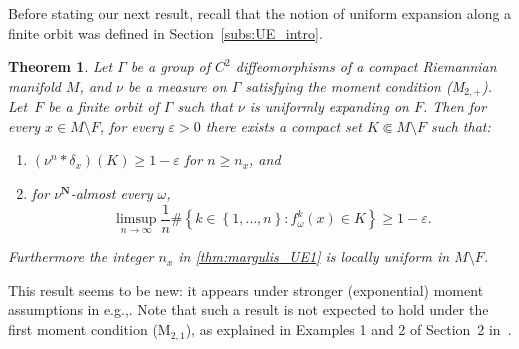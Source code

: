 \documentclass[11pt]{article}
\newcommand{\eg}{e.g.,\xspace}
\let\sep :
\let\e\varepsilon
\newcommand{\set}[1]{\left\{#1\right\}}
\newcommand{\unsur}[1]{\frac{1}{#1}}
\def\N{\mathbf{N}}
\theoremstyle{plain}
\newtheorem{thm}{Theorem}[section]
\theoremstyle{definition}
\numberwithin{equation}{section}
\begin{document}
Before stating our next result, recall that the notion of uniform expansion along a finite orbit was defined in Section~\ref{subs:UE_intro}.

\begin{thm}\label{thm:margulis_UE}
Let $\Gamma$ be a group of $C^2$ diffeomorphisms of a compact Riemannian
manifold $M$, and $\nu$ be a measure on
$\Gamma$ satisfying the moment condition (M$_{2,+}$).
Let~$F$ be a finite orbit of $\Gamma$ such that $\nu$ is uniformly expanding on $F$.
Then for every $x\in M\setminus F$, for every $\e>0$
there exists a compact set $K\Subset M\setminus F$ such that:
\begin{enumerate}
\item\label{thm:margulis_UE1} $(\nu^{n}\ast \delta_x) (K) \geq 1- \e$ for $n\geq n_x$, and
\item\label{thm:margulis_UE2} for $\nu^\N$-almost every $\omega$,
\[
\limsup_{n\to\infty} \unsur{n} \# \set{k\in \set{1, \ldots, n}\sep f^k_\omega(x) \in K} \geq 1-\e.
\]
\end{enumerate}
Furthermore the integer $n_x$ in \eqref{thm:margulis_UE1} is locally uniform in $M\setminus F$.
\end{thm}

This result seems to be new: it appears under stronger (exponential) moment assumptions
in \eg \cite{liu_thesis, chung}. Note that such a result is not expected to hold under the
first moment condition (M$_{2, 1}$), as explained in
Examples 1 and 2 of Section~2 in~\cite{benard-desaxce}.
\end{document}
